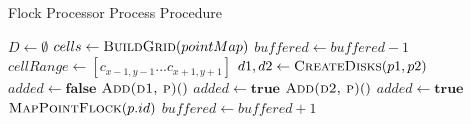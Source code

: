 \begin{algorithm}
\caption{Flock Processor Process Procedure}
\label{alg:fp}
\begin{algorithmic}[1]
        \State $D \gets \emptyset$
        \State $cells \gets \Call{BuildGrid}{pointMap}$
            \State {}
            \State $buffered \gets buffered - 1$
        \EndIf
            \State $cellRange \gets [c_{x - 1, y - 1}...c_{x + 1, y+ 1}]$
                        \State $d1, d2 \gets \Call{CreateDisks}{p1, p2}$
                            \State $added \gets \textbf{false}$
                                \State $\Call{Add(d1, p)}$
                                \State $added \gets \textbf{true}$
                            \EndIf
                                \State $\Call{Add(d2, p)}$
                                \State $added \gets \textbf{true}$
                            \EndIf
                                \State $\Call{MapPointFlock}{p.id}$
                            \EndIf
                        \EndFor
                        \State {}
                        \State {}
                    \EndIf
                \EndFor
            \EndFor
        \EndFor
        \State $buffered \gets buffered + 1$
    \EndProcedure
\end{algorithmic}
\end{algorithm}

